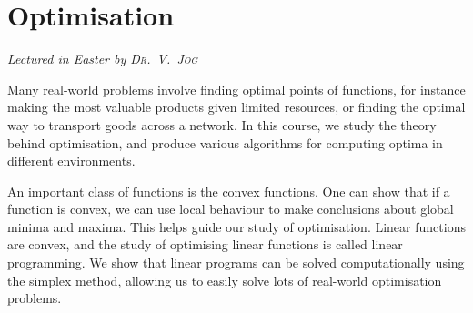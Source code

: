 \chapter[Optimisation \\ \textnormal{\emph{Lectured in Easter \oldstylenums{2021} by \textsc{Dr.\ V.\ Jog}}}]{Optimisation}
\emph{\Large Lectured in Easter  by \textsc{Dr.\ V.\ Jog}}

Many real-world problems involve finding optimal points of functions, for instance making the most valuable products given limited resources, or finding the optimal way to transport goods across a network.
In this course, we study the theory behind optimisation, and produce various algorithms for computing optima in different environments.

An important class of functions is the convex functions.
One can show that if a function is convex, we can use local behaviour to make conclusions about global minima and maxima.
This helps guide our study of optimisation.
Linear functions are convex, and the study of optimising linear functions is called linear programming.
We show that linear programs can be solved computationally using the simplex method, allowing us to easily solve lots of real-world optimisation problems.


